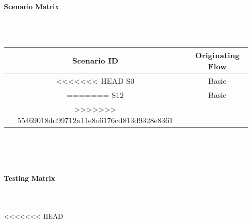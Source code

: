 \documentclass{article}
\begin{document}
\paragraph{Scenario Matrix}~\\ \\
\begin{tabular}{ c  c }
\hline
Scenario ID & Originating Flow\\
\hline
\hline
<<<<<<< HEAD
S0 & Basic\\
=======
S12 & Basic\\
>>>>>>> 55469018dd99712a11e8a6176cd813d9328e8361
\hline
\end{tabular}\\
~\\
~\\
\paragraph{Testing Matrix}~\\ \\
<<<<<<< HEAD
\end{document}
